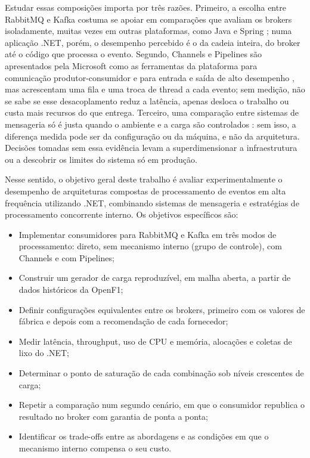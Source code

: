 \documentclass[12pt]{article}
\begin{document}
Estudar essas composições importa por três razões. Primeiro, a escolha entre RabbitMQ e
Kafka costuma se apoiar em comparações que avaliam os brokers isoladamente, muitas vezes
em outras plataformas, como Java e Spring \cite{dobbelaere:2017,kaminski:2025}; numa
aplicação .NET, porém, o desempenho percebido é o da cadeia inteira, do broker até o
código que processa o evento. Segundo, Channels e Pipelines são apresentados pela
Microsoft como as ferramentas da plataforma para comunicação produtor-consumidor e para
entrada e saída de alto desempenho \cite{microsoft:channels,microsoft:pipelines}, mas
acrescentam uma fila e uma troca de thread a cada evento; sem medição, não se sabe se esse
desacoplamento reduz a latência, apenas desloca o trabalho ou custa mais recursos do que
entrega. Terceiro, uma comparação entre sistemas de mensageria só é justa quando o
ambiente e a carga são controlados \cite{fu:2021}: sem isso, a diferença medida pode ser
da configuração ou da máquina, e não da arquitetura. Decisões tomadas sem essa evidência
levam a superdimensionar a infraestrutura ou a descobrir os limites do sistema só em
produção.

Nesse sentido, o objetivo geral deste trabalho é avaliar experimentalmente o desempenho de arquiteturas
compostas de processamento de eventos em alta frequência utilizando .NET, combinando
sistemas de mensageria e estratégias de processamento concorrente interno. Os objetivos
específicos são:

\begin{itemize}
  \item Implementar consumidores para RabbitMQ e Kafka em três modos de processamento:
        direto, sem mecanismo interno (grupo de controle), com Channels e com Pipelines;
  \item Construir um gerador de carga reproduzível, em malha aberta, a partir de dados
        históricos da OpenF1;
  \item Definir configurações equivalentes entre os brokers, primeiro com os valores de
        fábrica e depois com a recomendação de cada fornecedor;
  \item Medir latência, throughput, uso de CPU e memória, alocações e coletas de lixo do .NET;
  \item Determinar o ponto de saturação de cada combinação sob níveis crescentes de carga;
  \item Repetir a comparação num segundo cenário, em que o consumidor republica o
        resultado no broker com garantia de ponta a ponta;
  \item Identificar os trade-offs entre as abordagens e as condições em que o mecanismo
        interno compensa o seu custo.
\end{itemize}
\end{document}
